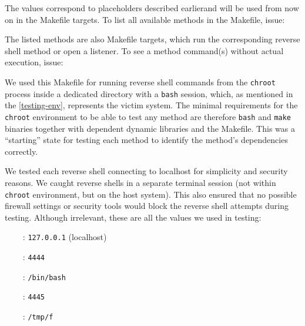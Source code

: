 The values correspond to placeholders described earlierand will be used from now on in the Makefile targets. To list all available methods in the Makefile, issue:


The listed methods are also Makefile targets, which run the corresponding reverse shell method or open a listener. To see a method command(s) without actual execution, issue:


We used this Makefile for running reverse shell commands from the \texttt{chroot} process inside a dedicated directory with a \texttt{bash} session, which, as mentioned in the \cref{testing-env}, represents the victim system. The minimal requirements for the \texttt{chroot} environment to be able to test any method are therefore \texttt{bash} and \texttt{make} binaries together with dependent dynamic libraries and the Makefile. This was a ``starting'' state for testing each method to identify the method's dependencies correctly.

We tested each reverse shell connecting to localhost for simplicity and security reasons. We caught reverse shells in a separate terminal session (not within \texttt{chroot} environment, but on the host system). This also ensured that no possible firewall settings or security tools would block the reverse shell attempts during testing. Although irrelevant, these are all the values we used in testing:

\setlength{\leftmargini}{5em}
\begin{itemize}
\item[\host\ :] \texttt{127.0.0.1} (localhost)
\item[\port\ :] \texttt{4444}
\item[\shell\ :] \texttt{/bin/bash}
\item[\portt\ :] \texttt{4445}
\item[\tmp\ :] \texttt{/tmp/f}
\end{itemize}
\setlength{\leftmargini}{2.5em}
